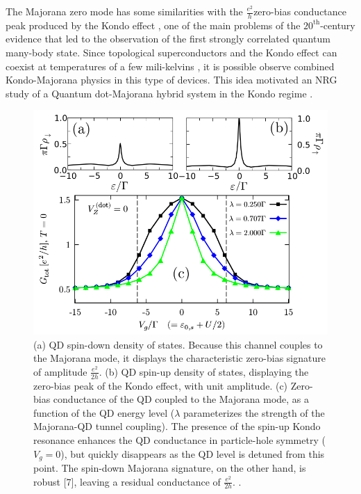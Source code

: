 The Majorana zero mode has some similarities with the $\frac{e^{2}}{h}$zero-bias conductance peak produced by the Kondo effect \citep{hewson_kondo_1997}, one of the main problems of the $20^\text{th}$-century evidence that led to the observation of the first strongly correlated quantum many-body state. Since topological superconductors and the Kondo effect can coexist at temperatures of a few mili-kelvins \cite{lee_zero-bias_2012}, it is possible observe combined Kondo-Majorana physics in this type of devices. This idea motivated an NRG study of a Quantum dot-Majorana hybrid system in the Kondo regime  \citep{ruiz-tijerina_interaction_2015}. 

\begin{figure}[t]
    \centering
    \includegraphics[scale=0.4]{IMAGES/Kondo-MajoranaCond.png}
    \caption{\label{Fig-Kondo-Majorana conductance}(a) QD spin-down
    density of states. Because this channel couples to the Majorana mode,
    it displays the characteristic zero-bias signature of amplitude
    $\frac{e^{2}}{2h}$. (b) QD spin-up density of states,
    displaying the zero-bias peak of the Kondo effect, with
    unit amplitude. (c) Zero-bias conductance of the QD coupled
    to the Majorana mode, as a function of the QD energy level ($\lambda$
    parameterizes the strength of the Majorana-QD tunnel coupling).
    The presence of the spin-up Kondo resonance enhances the
    QD conductance in particle-hole symmetry ($V_{g}=0$),
    but quickly disappears as the QD level is detuned from this point.
    The spin-down Majorana signature, on the other hand, is
    robust {[}7{]}, leaving a residual conductance of $\frac{e^{2}}{2h}$.
    \protect{}.}
\end{figure}

